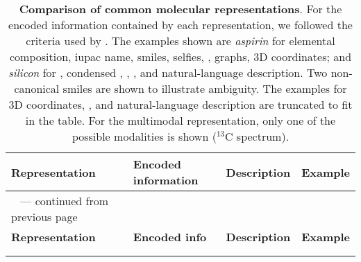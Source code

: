 \begin{longtable}{%
  >{\raggedright\arraybackslash}p{}
  >{\raggedright\arraybackslash}p{}
  >{\raggedright\arraybackslash}p{}
  >{\raggedright\arraybackslash}p{}
}
  \caption{\textbf{Comparison of common molecular representations}. For the encoded information contained by each representation, we followed the criteria used by \textcite{alampara2024mattext}. The examples shown are \textit{aspirin} for elemental composition, \gls{iupac} name, \gls{smiles}, \gls{selfies}, , graphs, 3D coordinates; and \textit{silicon} for , condensed , , , and natural-language description. Two non-canonical \gls{smiles} are shown to illustrate ambiguity. The examples for 3D coordinates, , and natural-language description are truncated to fit in the table. For the multimodal representation, only one of the possible modalities is shown ($^{13}$C  spectrum).}
  \label{tab:molecular-representations} \\
  \toprule
  \textbf{Representation} & \textbf{Encoded information} & \textbf{Description} & \textbf{Example} \\
  \midrule
  \endfirsthead

  \multicolumn{4}{c}%
  {\tablename\ \thetable{} — continued from previous page} \\
  \toprule
  \textbf{Representation} & \textbf{Encoded info} & \textbf{Description} & \textbf{Example} \\
  \midrule
  \endhead

  \midrule
  \multicolumn{4}{r}{Continued on next page} \\
  \endfoot



\end{longtable}
